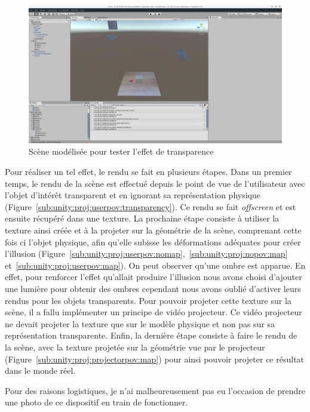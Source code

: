 \begin{figure}[H]
\centering
\includegraphics[width=0.75\linewidth, trim = 12cm 12cm 20cm 4.5cm, clip]{images/Unity-Projection-RealScene}
\caption{Scène modélisée pour tester l'effet de transparence}
\label{fig:unity:projscene}
\end{figure}

Pour réaliser un tel effet, le rendu se fait en plusieurs étapes. Dans un premier temps, le rendu de la scène est effectué depuis le point de vue de l'utilisateur avec l'objet d'intérêt transparent et en ignorant sa représentation physique (Figure~\ref{sub:unity:proj:userpov:transparency}). Ce rendu se fait \emph{offscreen} et est ensuite récupéré dans une texture. La prochaine étape consiste à utiliser la texture ainsi créée et à la projeter sur la géométrie de la scène, comprenant cette fois ci l'objet physique, afin qu'elle subisse les déformations adéquates pour créer l'illusion (Figure~\ref{sub:unity:proj:userpov:nomap},~\ref{sub:unity:proj:nopov:map} et~\ref{sub:unity:proj:userpov:map}). On peut observer qu'une ombre est apparue. En effet, pour renforcer l'effet qu'allait produire l'illusion nous avons choisi d'ajouter une lumière pour obtenir des ombres cependant nous avons oublié d'activer leurs rendus pour les objets transparents. Pour pouvoir projeter cette texture sur la scène, il a fallu implémenter un principe de vidéo projecteur. Ce vidéo projecteur ne devait projeter la texture que sur le modèle physique et non pas sur sa représentation transparente. Enfin, la dernière étape consiste à faire le rendu de la scène, avec la texture projetée sur la géométrie vue par le projecteur (Figure~\ref{sub:unity:proj:projectorpov:map}) pour ainsi pouvoir projeter ce résultat dans le monde réel. 

Pour des raisons logistiques, je n'ai malheureusement pas eu l'occasion de prendre une photo de ce dispositif en train de fonctionner.

